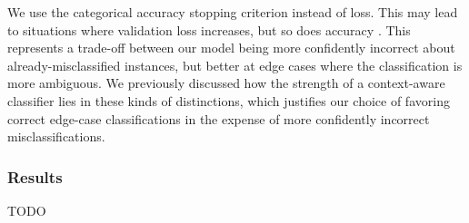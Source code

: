\documentclass[11pt, a4paper]{article}
\begin{document}
	We use the categorical accuracy stopping criterion instead of loss. This may lead to situations where validation loss increases, but so does accuracy \cite{loss-accuracy}. This represents a trade-off between our model being more confidently incorrect about already-misclassified instances, but better at edge cases where the classification is more ambiguous. We previously discussed how the strength of a context-aware classifier lies in these kinds of distinctions, which justifies our choice of favoring correct edge-case classifications in the expense of more confidently incorrect misclassifications.
	
	\subsubsection{Results}
	
	TODO
	
	\printbibliography
	
\end{document}
